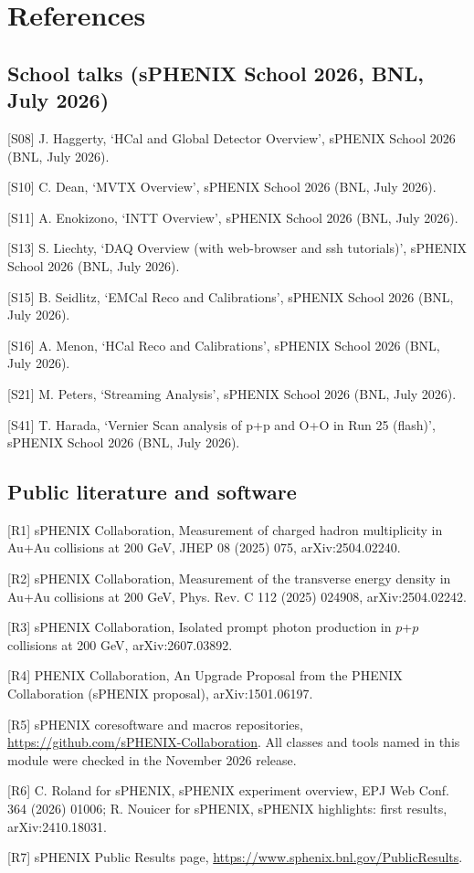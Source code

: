 \documentclass[11pt,letterpaper]{article}
\begin{document}
\section*{References}
\subsection*{School talks (sPHENIX School 2026, BNL, July 2026)}
\begin{description}[itemsep=1pt,font=\normalfont]
\item{[S08]} J. Haggerty, `HCal and Global Detector Overview', sPHENIX School 2026 (BNL, July 2026).
\item{[S10]} C. Dean, `MVTX Overview', sPHENIX School 2026 (BNL, July 2026).
\item{[S11]} A. Enokizono, `INTT Overview', sPHENIX School 2026 (BNL, July 2026).
\item{[S13]} S. Liechty, `DAQ Overview (with web-browser and ssh tutorials)', sPHENIX School 2026 (BNL, July 2026).
\item{[S15]} B. Seidlitz, `EMCal Reco and Calibrations', sPHENIX School 2026 (BNL, July 2026).
\item{[S16]} A. Menon, `HCal Reco and Calibrations', sPHENIX School 2026 (BNL, July 2026).
\item{[S21]} M. Peters, `Streaming Analysis', sPHENIX School 2026 (BNL, July 2026).
\item{[S41]} T. Harada, `Vernier Scan analysis of p+p and O+O in Run 25 (flash)', sPHENIX School 2026 (BNL, July 2026).
\end{description}
\subsection*{Public literature and software}
\begin{description}[itemsep=1pt,font=\normalfont]
\item{[R1]} sPHENIX Collaboration, Measurement of charged hadron multiplicity in Au+Au collisions at 200 GeV, JHEP 08 (2025) 075, arXiv:2504.02240.
\item{[R2]} sPHENIX Collaboration, Measurement of the transverse energy density in Au+Au collisions at 200 GeV, Phys. Rev. C 112 (2025) 024908, arXiv:2504.02242.
\item{[R3]} sPHENIX Collaboration, Isolated prompt photon production in $p$+$p$ collisions at 200 GeV, arXiv:2607.03892.
\item{[R4]} PHENIX Collaboration, An Upgrade Proposal from the PHENIX Collaboration (sPHENIX proposal), arXiv:1501.06197.
\item{[R5]} sPHENIX coresoftware and macros repositories, \url{https://github.com/sPHENIX-Collaboration}. All classes and tools named in this module were checked in the November 2026 release.
\item{[R6]} C. Roland for sPHENIX, sPHENIX experiment overview, EPJ Web Conf. 364 (2026) 01006; R. Nouicer for sPHENIX, sPHENIX highlights: first results, arXiv:2410.18031.
\item{[R7]} sPHENIX Public Results page, \url{https://www.sphenix.bnl.gov/PublicResults}.
\end{description}
\end{document}
